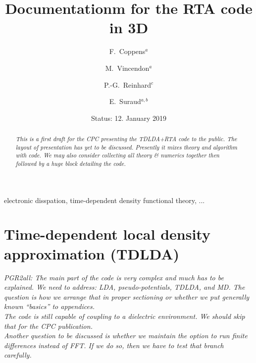 \documentclass[final,1p]{elsarticle}
\newcommand{\PGR}[1]{{\color{blue} #1}}
\newcommand{\PGRcomm}[1]{{\color{blue}\small\em PGR2all: #1}}
\begin{document}
\begin{frontmatter}

\title{Documentationm for the RTA code in 3D}

\author{F.~Coppens$^a$}
\author{M.~Vincendon$^a$}
\author{P.-G.~Reinhard$^c$}
\author{E.~Suraud$^{a,b}$}
\address{$^a$Universit\'e de Toulouse; UPS; Laboratoire de Physique
             Th\'{e}orique, IRSAMC; F-31062 Toulouse Cedex, France}
\address{$^b$Laboratoire de Physique Th\'eorique, Universit\'e Paul
  Sabatier, CNRS, F-31062 Toulouse C\'edex, France}
\address{$^c$Institut f{\"u}r Theoretische Physik, Universit{\"a}t
  Erlangen, D-91058 Erlangen, Germany}

\date{Status: 12. January 2019}
\begin{abstract}
\PGR{\em This is a first draft for the CPC presenting the TDLDA+RTA code
  to the public. The layout of presentation has yet to be discussed.
Presently it mixes theory and algorithm with code. We may also
consider collecting all theory \& numerics together then followed by a
huge block detailing the code.}
\end{abstract}

\begin{keyword}
electronic disspation, time-dependent
density functional theory, ...
\end{keyword}
\end{frontmatter}

\newpage



\section{Time-dependent local density approximation (TDLDA)}
\label{sec:TDLDA}

\PGRcomm{The main part of the code is very complex and much has to be
  explained. We need to address: LDA, pseudo-potentials, TDLDA, and
  MD. The question is how we arrange that in proper sectioning or
  whether we put generally known ``basics'' to appendices.
\\
The code is still capable of coupling to a dielectric
  environment. We should skip that for the CPC publication.
\\
Another question to be discussed is whether we maintain the option to
run finite differences instead of FFT. If we do so, then we have to
test that branch carefully.
}
\end{document}
